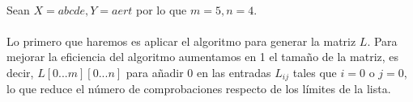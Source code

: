 \documentclass{article}
\begin{document}
			\paragraph{}
			Sean $X = abcde, Y = aert $ por lo que $m = 5, n = 4$.

			\paragraph{}
			Lo primero que haremos es aplicar el algoritmo para generar la matriz $L$.
			Para mejorar la eficiencia del algoritmo aumentamos en 1 el tamaño de la matriz, es decir, $L[0...m][0...n]$ para añadir 0 en las entradas $L_{ij}$ tales que $i = 0$ o $j = 0$, lo que reduce el número de comprobaciones respecto de los límites de la lista.
\end{document}

